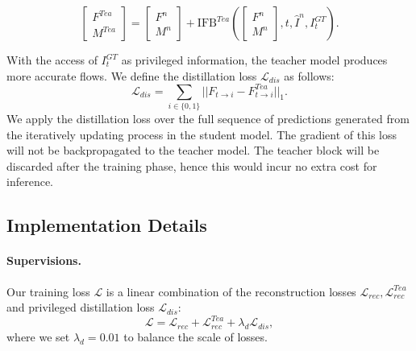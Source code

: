 \documentclass[final]{cvpr}
\begin{document}
\begin{equation}
\left[ \begin{array}{c}F^{Tea} \\ M^{Tea} \end{array} \right ] = \left[ \begin{array}{c}F^n \\ M^n \end{array} \right ] + \text{IFB}^{Tea}(\left[ \begin{array}{c}F^n \\ M^n \end{array} \right ], t, \widehat{I}^n, I^{GT}_t).
\end{equation}

With the access of $I^{GT}_t$ as privileged information, the teacher model produces more accurate flows. We define the distillation loss $\mathcal{L}_{dis}$ as follows:
\begin{equation}
\mathcal{L}_{dis} = \sum_{i\in\{0, 1\}}|| F_{t\rightarrow i} - F^{Tea}_{t\rightarrow i}||_1.
\end{equation} 
We apply the distillation loss over the full sequence of predictions generated from the iteratively updating process in the student model. The gradient of this loss will not be backpropagated to the teacher model. The teacher block will be discarded after the training phase, hence this would incur no extra cost for inference.



















\subsection{Implementation Details}
\label{subsec:implement}

\paragraph{Supervisions.} Our training loss $\mathcal{L}$ is a linear combination of the reconstruction losses $\mathcal{L}_{rec}, \mathcal{L}^{Tea}_{rec}$ and privileged distillation loss $\mathcal{L}_{dis}$:  
\begin{equation}
\mathcal{L} = \mathcal{L}_{rec} + \mathcal{L}^{Tea}_{rec} + \lambda_{d} \mathcal{L}_{dis}
\label{eq:total_loss},
\end{equation}
where we set $\lambda_{d} = 0.01$ to balance the scale of losses.
\end{document}
